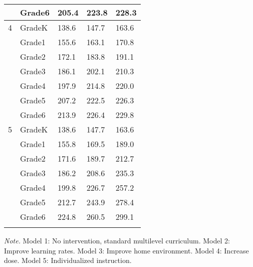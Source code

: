 \documentclass[english,floatsintext,jou]{apa6}
\theoremstyle{definition}
\theoremstyle{definition}
\theoremstyle{definition}
\theoremstyle{remark}
\begin{document}
\begin{table}[tbp]
\begin{center}
\begin{threeparttable}
{\begin{tabular}{lllll}
 & Grade6 & 205.4 & 223.8 & 228.3\\ \midrule
4 & GradeK & 138.6 & 147.7 & 163.6\\
 & Grade1 & 155.6 & 163.1 & 170.8\\
 & Grade2 & 172.1 & 183.8 & 191.1\\
 & Grade3 & 186.1 & 202.1 & 210.3\\
 & Grade4 & 197.9 & 214.8 & 220.0\\
 & Grade5 & 207.2 & 222.5 & 226.3\\
 & Grade6 & 213.9 & 226.4 & 229.8\\ \midrule
5 & GradeK & 138.6 & 147.7 & 163.6\\
 & Grade1 & 155.8 & 169.5 & 189.0\\
 & Grade2 & 171.6 & 189.7 & 212.7\\
 & Grade3 & 186.2 & 208.6 & 235.3\\
 & Grade4 & 199.8 & 226.7 & 257.2\\
 & Grade5 & 212.7 & 243.9 & 278.4\\
 & Grade6 & 224.8 & 260.5 & 299.1\\
\bottomrule
\addlinespace
\end{tabular}
}
\begin{tablenotes}[para]
\textit{Note.} Model 1: No intervention, standard multilevel curriculum. Model 2: Improve learning rates. Model 3: Improve home environment. Model 4: Increase dose. Model 5: Individualized instruction.
\end{tablenotes}
\end{threeparttable}
\end{center}
\end{table}
\end{document}
